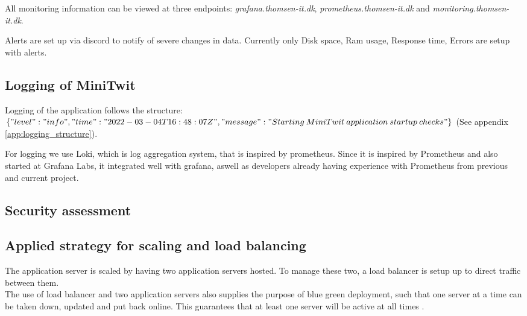 All monitoring information can be viewed at three endpoints: \textit{grafana.thomsen-it.dk}, \textit{prometheus.thomsen-it.dk} and \textit{monitoring.thomsen-it.dk}\cite{issue105}.

Alerts are set up via discord to notify of severe changes in data. Currently only Disk space, Ram usage, Response time, Errors are setup with alerts. \cite{issue150}


\subsection{Logging of MiniTwit}
Logging of the application follows the structure: \\
$\{"level":"info","time":"2022-03-04T16:48:07Z",\\"message":"Starting\: MiniTwit\: application\: startup\: checks"\}$\cite{issue90} (See appendix \ref{app:logging_structure}).

For logging we use Loki, which is log aggregation system, that is inspired by prometheus. Since it is inspired by Prometheus and also started at Grafana Labs, it integrated well with grafana, aswell as developers already having experience with Prometheus from previous and current project. 

\subsection{Security assessment}


\subsection{Applied strategy for scaling and load balancing}
The application server is scaled by having two application servers hosted. To manage these two, a load balancer is setup up to direct traffic between them. \cite{issue175} \\
The use of load balancer and two application servers also supplies the purpose of blue green deployment, such that one server at a time can be taken down, updated and put back online. This guarantees that at least one server will be active at all times \cite{blue_green_deployment}.

